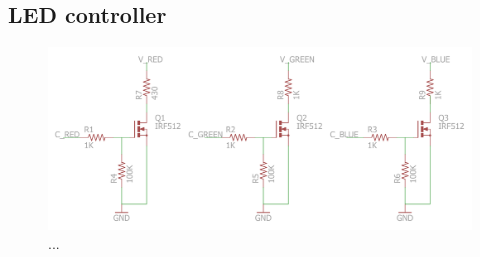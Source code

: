 

\subsection{LED controller}



\begin{figure}[H]
\centering 
\includegraphics[width = 0.4 \textwidth]{images/leddriver_schematics}
\caption{...}
\label{fig:...}
\end{figure}